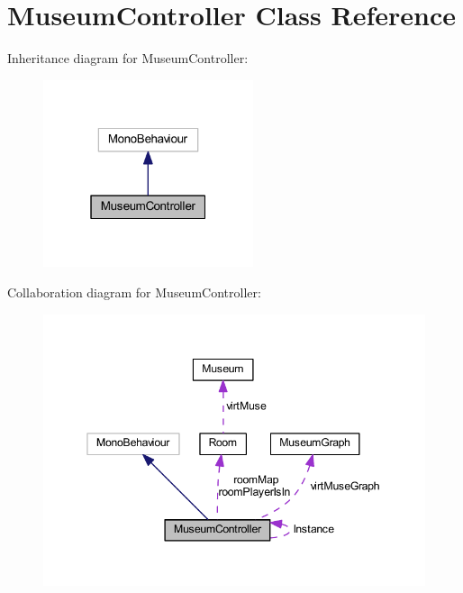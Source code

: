 \hypertarget{class_museum_controller}{}\section{Museum\+Controller Class Reference}
\label{class_museum_controller}


Inheritance diagram for Museum\+Controller\+:
\nopagebreak
\begin{figure}[H]
\begin{center}
\leavevmode
\includegraphics[width=175pt]{class_museum_controller__inherit__graph}
\end{center}
\end{figure}


Collaboration diagram for Museum\+Controller\+:
\nopagebreak
\begin{figure}[H]
\begin{center}
\leavevmode
\includegraphics[width=345pt]{class_museum_controller__coll__graph}
\end{center}
\end{figure}
